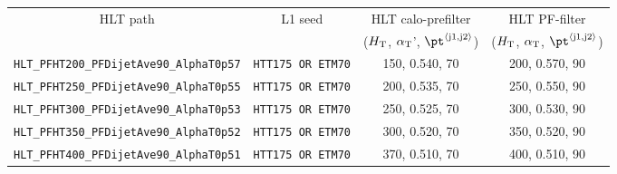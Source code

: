 \begin{table}[h!]
\footnotesize
\centering
\begin{tabular}{c|ccc} 
\hline
\hline
HLT path & L1 seed & HLT calo-prefilter                      & HLT PF-filter                          \\ %
         &         & ($\mbox{$H_\text{T}$}$, $\alpha_{\text{T}}$', $\pt^{\rm \left<j1,j2\right>}$) & ($\mbox{$H_\text{T}$}$, $\alpha_{\text{T}}$, $\pt^{\rm \left<j1,j2\right>}$) \\ %
\hline
\verb!HLT_PFHT200_PFDijetAve90_AlphaT0p57! & \verb!HTT175 OR ETM70! & 150, 0.540, 70 & 200, 0.570, 90 \\ %
\verb!HLT_PFHT250_PFDijetAve90_AlphaT0p55! & \verb!HTT175 OR ETM70! & 200, 0.535, 70 & 250, 0.550, 90 \\ %
\verb!HLT_PFHT300_PFDijetAve90_AlphaT0p53! & \verb!HTT175 OR ETM70! & 250, 0.525, 70 & 300, 0.530, 90 \\ %
\verb!HLT_PFHT350_PFDijetAve90_AlphaT0p52! & \verb!HTT175 OR ETM70! & 300, 0.520, 70 & 350, 0.520, 90 \\ %
\verb!HLT_PFHT400_PFDijetAve90_AlphaT0p51! & \verb!HTT175 OR ETM70! & 370, 0.510, 70 & 400, 0.510, 90 \\ %
\hline
\hline

\end{tabular}
\label{tab:2015_Hadronic_Signal_Triggers}
\end{table}




